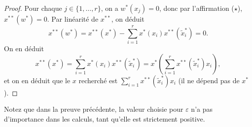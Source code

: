 \begin{proof}
  Pour chaque $j\in\{1, \ldots, r\}$, on a $w^*(x_j)=0$, donc par l'affirmation
  ($\star$), $x^{**}(w^*)=0$. Par linéarité de $x^{**}$, on déduit
  \begin{equation*}
    x^{**}(w^*) = x^{**}(x^*)-\sum_{i=1}^rx^*(x_i)x^{**}(\widetilde{x}_i^*)=0.
  \end{equation*}
  On en déduit
  \begin{equation*}
    x^{**}(x^*)=\sum_{i=1}^rx^*(x_i)x^{**}(\widetilde{x}_i^*)
    = x^*\left(\sum_{i=1}^rx^{**}(\widetilde{x}_i^*)x_i\right),
  \end{equation*}
  et on en déduit que le $x$ recherché est
  $\sum_{i=1}^rx^{**}(\widetilde{x}_i^*)x_i$ (il ne dépend pas
  de $x^*$).
\end{proof}

Notez que dans la preuve précédente, la valeur choisie pour $\varepsilon$
n'a pas d'importance dans les calculs, tant qu'elle est strictement positive.
